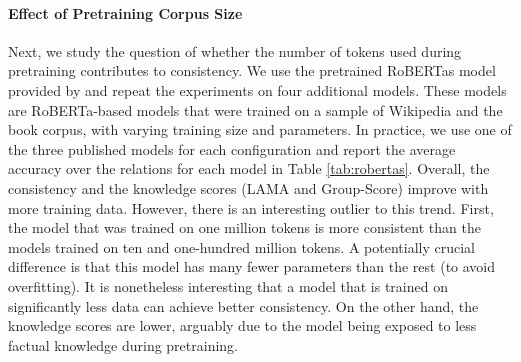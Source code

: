 













\paragraph{Effect of Pretraining Corpus Size}
Next, we study the question of whether the number of tokens used during pretraining contributes to consistency.
We use the pretrained RoBERTas model provided by \citet{robertas} and repeat the experiments on four additional models.
These models are RoBERTa-based models that were trained on a sample of Wikipedia and the book corpus, with varying training size and parameters. In practice, we use one of the three published models for each configuration and report the average accuracy over the relations for each model in Table \ref{tab:robertas}.
Overall, the consistency and the knowledge scores (LAMA and
Group-Score) improve
with more training data.
However, there is an interesting outlier to this trend.
First, the model that was trained on one million tokens is
more consistent than the models trained on ten and
one-hundred million tokens. A potentially crucial difference
is that this model
has many fewer parameters than the rest (to avoid overfitting). It is nonetheless interesting that a model that is trained on significantly less data can achieve better consistency. On the other hand, the knowledge scores are lower, arguably due to the model being exposed to less factual knowledge during pretraining.

